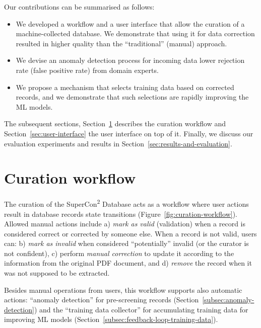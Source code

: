 \documentclass[]{interact}
\theoremstyle{plain} %
\theoremstyle{definition}
\theoremstyle{remark}
\begin{document}
Our contributions can be summarised as follows:
\begin{itemize}
    \item We developed a workflow and a user interface that allow the curation of a machine-collected database. We demonstrate that using it for data correction resulted in higher quality than the ``traditional'' (manual) approach.
    \item We devise an anomaly detection process for incoming data lower rejection rate (false positive rate) from domain experts.
    \item We propose a mechanism that selects training data based on corrected records, and we demonstrate that such selections are rapidly improving the ML models.
\end{itemize}

The subsequent sections, Section~\ref{sec:curation-workflow} describes the curation workflow and Section~\ref{sec:user-interface} the user interface on top of it.
Finally, we discuss our evaluation experiments and results in Section~\ref{sec:results-and-evaluation}.  

\section{Curation workflow}
\label{sec:curation-workflow}
The curation of the SuperCon\textsuperscript{2} Database acts as a workflow where user actions result in database records state transitions (Figure~\ref{fig:curation-workflow}). 
Allowed manual actions include a) \textit{mark as valid} (validation) when a record is considered correct or corrected by someone else. When a record is not valid, users can: b) \textit{mark as invalid} when considered ``potentially'' invalid (or the curator is not confident), c) perform \textit{manual correction} to update it according to the information from the original PDF document, and d) \textit{remove} the record when it was not supposed to be extracted.

Besides manual operations from users, this workflow supports also automatic actions: ``anomaly detection'' for pre-screening records (Section~\ref{subsec:anomaly-detection}) and the ``training data collector'' for accumulating training data for improving ML models (Section~\ref{subsec:feedback-loop-training-data}). 

\end{document}
